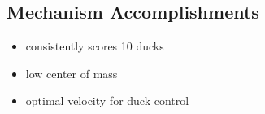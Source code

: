


\subsection*{Mechanism Accomplishments}
\begin{itemize}
    \item consistently scores 10 ducks 
    \item low center of mass 
    \item optimal velocity for duck control
\end{itemize} 

